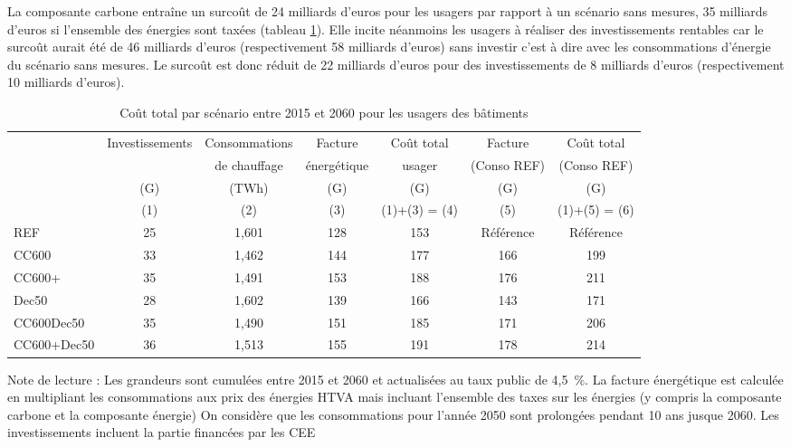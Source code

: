 \documentclass[10.5pt,a4paper]{article}
\def\euro{\mbox{\raisebox{.25ex}{{\it =}}\hspace{-.5em}{\sf C}}}
\begin{document}
{%

La composante carbone entraîne un surcoût de 24 milliards d'euros pour les usagers par rapport à un scénario sans mesures, 35 milliards d'euros si l'ensemble des énergies sont taxées (tableau \ref{Bilan_usager_CC}). Elle incite néanmoins les usagers à réaliser des investissements rentables car le surcoût aurait été de 46 milliards d'euros (respectivement 58 milliards d'euros) sans investir c'est à dire avec les consommations d'énergie du scénario sans mesures. Le surcoût est donc réduit de 22 milliards d'euros pour des investissements de 8 milliards d'euros (respectivement 10 milliards d'euros).
	
	\begin{table}[h] \caption{Coût total par scénario entre 2015 et 2060 pour les usagers des bâtiments}\label{Bilan_usager_CC}
\begin{center}
\scriptsize
\begin{tabular}[c]{|l|c|c|c|c|c|c|}
\hline
					& Investissements &  Consommations 		&	Facture  		 & Coût total & Facture 		& Coût total  \\
					&									& 	de chauffage		& énergétique & 	 usager		& (Conso REF)	&	(Conso REF) \\
					&		(G\euro)		&			(TWh)				&		(G\euro) 					& (G\euro)	 	& (G\euro) 					& (G\euro) \\
					&    (1) 				&      (2)        &      (3)            & (1)+(3) = (4) &  (5) & (1)+(5) = (6) \\
\hline
REF 					&	25 &1,601 &128 &153 & Référence & Référence\\
CC600 				&	33 &1,462 &144 &177 &166 &199 \\
CC600+ 				&	35 &1,491 &153 &188 &176 &211 \\
Dec50 				&	28 &1,602 &139 &166 &143 &171 \\
CC600Dec50 		&	35 &1,490 &151 &185 &171 &206 \\
CC600+Dec50		&	36 &1,513 &155 &191 &178 &214 \\
\hline
\end{tabular}
\end{center}
	\footnotesize{Note de lecture : Les grandeurs sont cumulées entre 2015 et 2060 et actualisées au taux public de 4,5~\%.  La facture énergétique est calculée en multipliant les consommations aux prix des énergies HTVA mais incluant l'ensemble des taxes sur les énergies (y compris la composante carbone et la composante énergie)  On considère que les consommations pour l'année 2050 sont prolongées pendant 10 ans jusque 2060. Les investissements incluent la partie financées par les CEE}
\end{table}

}
\end{document}
